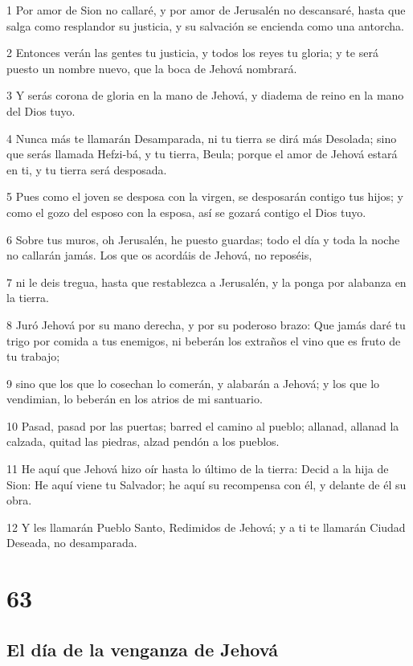 \par 1 Por amor de Sion no callaré, y por amor de Jerusalén no descansaré, hasta que salga como resplandor su justicia, y su salvación se encienda como una antorcha.
\par 2 Entonces verán las gentes tu justicia, y todos los reyes tu gloria; y te será puesto un nombre nuevo, que la boca de Jehová nombrará.
\par 3 Y serás corona de gloria en la mano de Jehová, y diadema de reino en la mano del Dios tuyo.
\par 4 Nunca más te llamarán Desamparada, ni tu tierra se dirá más Desolada; sino que serás llamada Hefzi-bá, y tu tierra, Beula; porque el amor de Jehová estará en ti, y tu tierra será desposada.
\par 5 Pues como el joven se desposa con la virgen, se desposarán contigo tus hijos; y como el gozo del esposo con la esposa, así se gozará contigo el Dios tuyo.
\par 6 Sobre tus muros, oh Jerusalén, he puesto guardas; todo el día y toda la noche no callarán jamás. Los que os acordáis de Jehová, no reposéis,
\par 7 ni le deis tregua, hasta que restablezca a Jerusalén, y la ponga por alabanza en la tierra.
\par 8 Juró Jehová por su mano derecha, y por su poderoso brazo: Que jamás daré tu trigo por comida a tus enemigos, ni beberán los extraños el vino que es fruto de tu trabajo;
\par 9 sino que los que lo cosechan lo comerán, y alabarán a Jehová; y los que lo vendimian, lo beberán en los atrios de mi santuario.
\par 10 Pasad, pasad por las puertas; barred el camino al pueblo; allanad, allanad la calzada, quitad las piedras, alzad pendón a los pueblos.
\par 11 He aquí que Jehová hizo oír hasta lo último de la tierra: Decid a la hija de Sion: He aquí viene tu Salvador; he aquí su recompensa con él, y delante de él su obra. 
\par 12 Y les llamarán Pueblo Santo, Redimidos de Jehová; y a ti te llamarán Ciudad Deseada, no desamparada.

\chapter{63}

\section*{El día de la venganza de Jehová}

